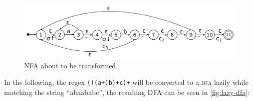 \documentclass[english]{sigplanconf}
\theoremstyle{definition}
\begin{document}
\begin{figure}
\begin{centering}
\includegraphics[width=\linewidth]{graphs/abc}
\par\end{centering}

\caption{NFA about to be transformed.}
\end{figure}
In the following, the regex \texttt{(((a+)b)+c)+} will be converted
to a \textsc{dfa} lazily while matching the string ``abaababc'',
the resulting DFA can be seen in \ref{fig:lazy-dfa}: 
\end{document}
